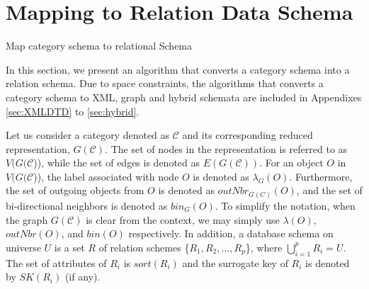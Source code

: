 \section{Mapping to Relation Data Schema}





\begin{algorithm} \caption{Map  category schema to relational Schema}
\label{alg:map2relationschema}

\end{algorithm}

In this section, we present an algorithm that converts a category schema into a relation schema. Due to space constraints, the algorithms that converts a category schema to XML, graph and hybrid schemata are included in Appendixes \ref{sec:XMLDTD} to \ref{sec:hybrid}.




Let us consider a category denoted as $\mathcal{C}$ and its corresponding reduced representation, $G(\mathcal{C})$.  The set of nodes in the representation is referred to as $V(G(\mathcal{C}$)), while the set of edges is denoted as $E(G(\mathcal{C}))$.  For an object $O$ in $V(G(\mathcal{C}$)), the label associated with node $O$ is denoted as $\lambda_G(O)$.  Furthermore, the set of outgoing objects from  $O$ is denoted as $outNbr_{G(C)}(O)$, and the set of bi-directional neighbors is denoted as $bin_G(O)$. To simplify the notation, when the graph $G(\mathcal{C})$ is clear from the context, we may simply use $\lambda(O)$,  $outNbr(O)$, and $bin(O)$ respectively. In addition, a database schema on universe $U$ is a set $R$ of relation schemes \{$R_1,R_2,...,R_p$\},
where  $\bigcup_{i=1}^{p} R_{i} = U$.
The set of attributes of $R_i$ is $sort(R_i)$ and the surrogate key of $R_i$ is denoted by $SK(R_i)$ (if any).

